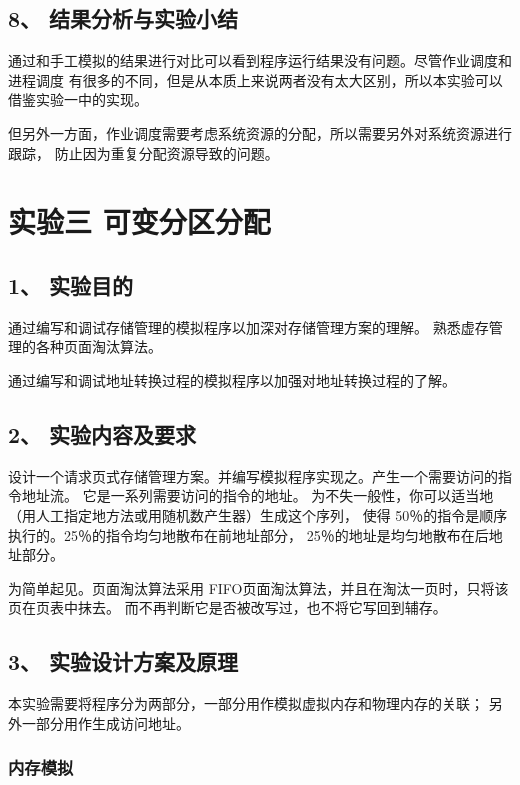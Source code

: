 \documentclass[12bp]{guo}
\begin{document}
\subsection{8、 结果分析与实验小结}

通过和手工模拟的结果进行对比可以看到程序运行结果没有问题。尽管作业调度和进程调度
有很多的不同，但是从本质上来说两者没有太大区别，所以本实验可以借鉴实验一中的实现。


但另外一方面，作业调度需要考虑系统资源的分配，所以需要另外对系统资源进行跟踪，
防止因为重复分配资源导致的问题。

\clearpage

\section{实验三 可变分区分配}

\subsection{1、 实验目的}

通过编写和调试存储管理的模拟程序以加深对存储管理方案的理解。
熟悉虚存管理的各种页面淘汰算法。


通过编写和调试地址转换过程的模拟程序以加强对地址转换过程的了解。

\subsection{2、 实验内容及要求}

设计一个请求页式存储管理方案。并编写模拟程序实现之。产生一个需要访问的指令地址流。
它是一系列需要访问的指令的地址。
为不失一般性，你可以适当地（用人工指定地方法或用随机数产生器）生成这个序列，
使得 50％的指令是顺序执行的。25％的指令均匀地散布在前地址部分，
25％的地址是均匀地散布在后地址部分。


为简单起见。页面淘汰算法采用 FIFO页面淘汰算法，并且在淘汰一页时，只将该页在页表中抹去。
而不再判断它是否被改写过，也不将它写回到辅存。


\subsection{3、 实验设计方案及原理}

本实验需要将程序分为两部分，一部分用作模拟虚拟内存和物理内存的关联；
另外一部分用作生成访问地址。


\subsubsection{内存模拟}
\end{document}
